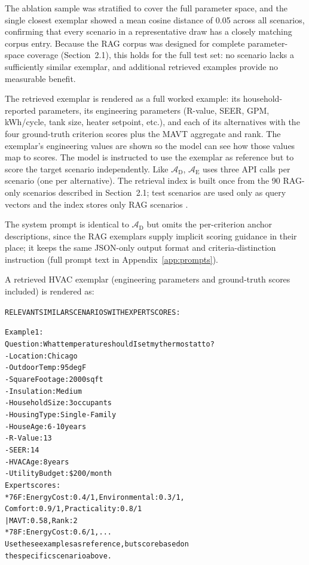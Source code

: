 \documentclass[final,3p,times]{elsarticle}
\begin{document}
The ablation sample was stratified to cover the full parameter space, and the single closest exemplar showed a mean cosine distance of 0.05 across all scenarios, confirming that every scenario in a representative draw has a closely matching corpus entry. Because the RAG corpus was designed for complete parameter-space coverage (Section~2.1), this holds for the full test set: no scenario lacks a sufficiently similar exemplar, and additional retrieved examples provide no measurable benefit.

The retrieved exemplar is rendered as a full worked example: its household-reported parameters, its engineering parameters (R-value, SEER, GPM, kWh/cycle, tank size, heater setpoint, etc.), and each of its alternatives with the four ground-truth criterion scores plus the MAVT aggregate and rank. The exemplar's engineering values are shown so the model can see how those values map to scores. The model is instructed to use the exemplar as reference but to score the target scenario independently. Like $\mathcal{A}_{\text{D}}$, $\mathcal{A}_{\text{E}}$ uses three API calls per scenario (one per alternative). The retrieval index is built once from the 90 RAG-only scenarios described in Section~2.1; test scenarios are used only as query vectors and the index stores only RAG scenarios \cite{lewis2020}.

The system prompt is identical to $\mathcal{A}_{\text{D}}$ but omits the per-criterion anchor descriptions, since the RAG exemplars supply implicit scoring guidance in their place; it keeps the same JSON-only output format and criteria-distinction instruction (full prompt text in Appendix~\ref{app:prompts}).

\noindent A retrieved HVAC exemplar (engineering parameters and ground-truth scores included) is rendered as:

\begin{alltt}
\small
RELEVANT SIMILAR SCENARIOS WITH EXPERT SCORES:

Example 1:
  Question: What temperature should I set my thermostat to?
  - Location: Chicago
  - Outdoor Temp: 95 deg F
  - Square Footage: 2000 sqft
  - Insulation: Medium
  - Household Size: 3 occupants
  - Housing Type: Single-Family
  - House Age: 6-10 years
  - R-Value: 13
  - SEER: 14
  - HVAC Age: 8 years
  - Utility Budget: \$200/month
  Expert scores:
  * 76 F: Energy Cost: 0.4/1, Environmental: 0.3/1,
    Comfort: 0.9/1, Practicality: 0.8/1
    | MAVT: 0.58, Rank: 2
  * 78 F: Energy Cost: 0.6/1, ...
Use these examples as reference, but score based on
the specific scenario above.
\end{alltt}
\end{document}

